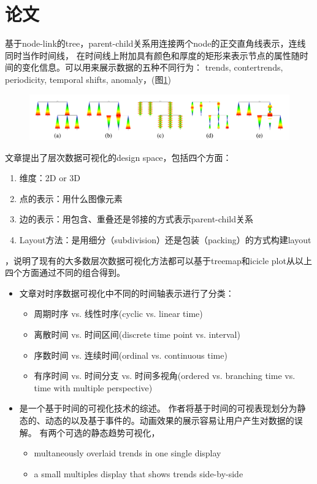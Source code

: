 \documentclass{article}
\begin{document}
\section{论文}

\cite{burch2011}基于node-link的tree，parent-child关系用连接两个node的正交直角线表示，连线同时当作时间线，
在时间线上附加具有颜色和厚度的矩形来表示节点的属性随时间的变化信息。可以用来展示数据的五种不同行为：
trends, contertrends, periodicity, temporal shifts, anomaly，(图\ref{fig:burch2011.png})
\begin{figure}[h]
	\centering
	\includegraphics[width=\textwidth]{_img/burch2011_.png}
	\label{fig:burch2011.png}
\end{figure}

文章\cite{JHS2011}提出了层次数据可视化的design space，包括四个方面：
\begin{enumerate}
	\item 维度：2D or 3D
	\item 点的表示：用什么图像元素
	\item 边的表示：用包含、重叠还是邻接的方式表示parent-child关系
	\item Layout方法：是用细分（subdivision）还是包装（packing）的方式构建layout
\end{enumerate}
，说明了现有的大多数层次数据可视化方法都可以基于treemap和icicle plot从以上四个方面通过不同的组合得到。

\begin{itemize}
	\item 文章\cite{frank1998different}对时序数据可视化中不同的时间轴表示进行了分类：
		\begin{itemize}
			\item 周期时序 vs. 线性时序(cyclic vs. linear time)
			\item 离散时间 vs. 时间区间(discrete time point vs. interval)
			\item 序数时间 vs. 连续时间(ordinal vs. continuous time)
			\item 有序时间 vs. 时间分支 vs. 时间多视角(ordered vs. branching time vs. time with multiple perspective)
		\end{itemize}
	\item \cite{muller2003visualization}是一个基于时间的可视化技术的综述。
		作者将基于时间的可视表现划分为静态的、动态的以及基于事件的。动画效果的展示容易让用户产生对数据的误解。
		有两个可选的静态趋势可视化，
		\begin{itemize}
			\item multaneously overlaid trends in one single display
			\item a small multiples display that shows trends side-by-side
		\end{itemize}
\end{itemize}
\end{document}
